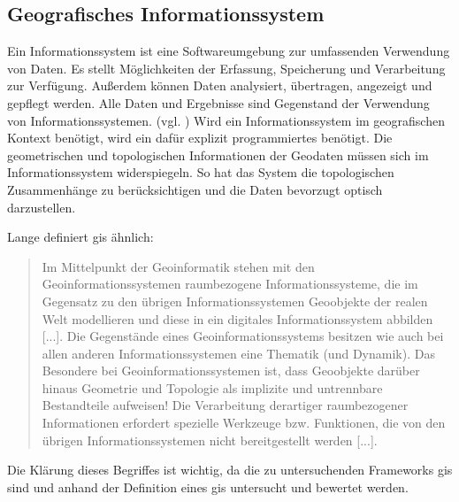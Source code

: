 \subsection{Geografisches Informationssystem}
\label{grundlagen:gis}
Ein Informationssystem ist eine Softwareumgebung zur umfassenden Verwendung von Daten.
Es stellt Möglichkeiten der Erfassung, Speicherung und Verarbeitung zur Verfügung.
Außerdem können Daten analysiert, übertragen, angezeigt und gepflegt werden.
Alle Daten und Ergebnisse sind Gegenstand der Verwendung von Informationssystemen. (vgl. \cite[S.32]{book:kudrass})
Wird ein Informationssystem im geografischen Kontext benötigt, wird ein dafür explizit programmiertes benötigt.
Die geometrischen und topologischen Informationen der Geodaten müssen sich im Informationssystem widerspiegeln.
So hat das System die topologischen Zusammenhänge zu berücksichtigen und die Daten bevorzugt optisch darzustellen.

Lange definiert \Gls{gis} ähnlich:
\begin{quote}
Im Mittelpunkt  der  Geoinformatik  stehen  mit den  Geoinformationssystemen raumbezogene Informationssysteme, die im Gegensatz zu den übrigen Informationssystemen Geoobjekte  der realen Welt modellieren und diese in ein digitales Informationssystem abbilden [...]. Die Gegenstände eines Geoinformationssystems  besitzen  wie  auch  bei  allen  anderen  Informationssystemen  eine 
Thematik (und Dynamik). Das Besondere bei Geoinformationssystemen ist, dass Geoobjekte darüber hinaus Geometrie und Topologie als implizite und untrennbare Bestandteile aufweisen!  Die Verarbeitung derartiger raumbezogener Informationen erfordert spezielle Werkzeuge bzw. Funktionen, die von den übrigen Informationssystemen nicht bereitgestellt werden [...]. \cite[S.337]{book:gi-theopluspraxis3}
\end{quote}
Die Klärung dieses Begriffes ist wichtig, da die zu untersuchenden Frameworks \Gls{gis} sind und anhand der Definition eines \Gls{gis} untersucht und bewertet werden.


